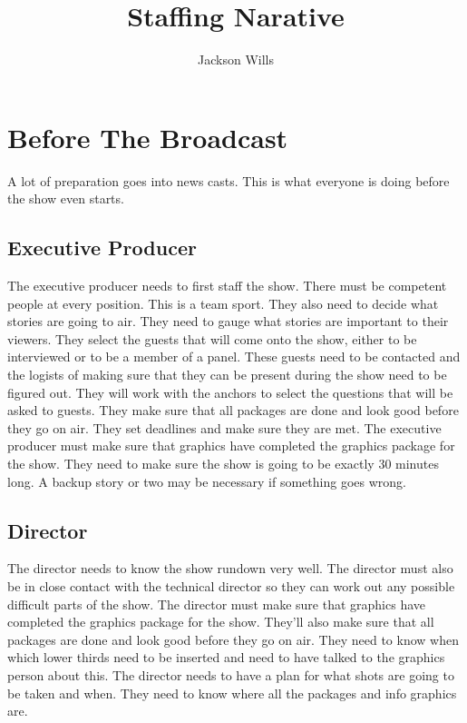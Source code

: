 \documentclass[letterpaper,10pt,oneside]{article}
\title{Staffing Narative}
\author{Jackson Wills}
\begin{document}
\maketitle

\tableofcontents

\clearpage

\section{Before The Broadcast}
A lot of preparation goes into news casts. This is what everyone is doing before the show even starts.

\subsection{Executive Producer}
The executive producer needs to first staff the show. There must be competent people at every position. This is a team sport. They also need to decide what stories are going to air. They need to gauge what stories are important to their viewers. They select the guests that will come onto the show, either to be interviewed or to be a member of a panel. These guests need to be contacted and the logists of making sure that they can be present during the show need to be figured out. They will work with the anchors to select the questions that will be asked to guests. They make sure that all packages are done and look good before they go on air. They set deadlines and make sure they are met.
The executive producer must make sure that graphics have completed the graphics package for the show. They need to make sure the show is going to be exactly 30 minutes long. A backup story or two may be necessary if something goes wrong.

\subsection{Director}
The director needs to know the show rundown very well.
The director must also be in close contact with the technical director so they can work out any possible difficult parts of the show. The director must make sure that graphics have completed the graphics package for the show.
They'll also make sure that all packages are done and look good before they go on air. They need to know when which lower thirds need to be inserted and need to have talked to the graphics person about this. The director needs to have a plan for what shots are going to be taken and when. They need to know where all the packages and info graphics are.
\end{document}

